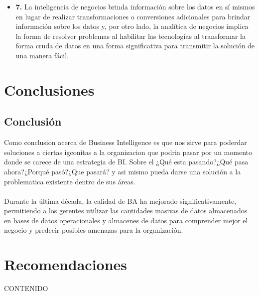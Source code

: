\documentclass[preprint,12pt]{elsarticle}
\begin{document}
\begin{itemize}
	\item{\textbf{7.}} La inteligencia de negocios brinda información sobre los datos en sí mismos en lugar de realizar 				transformaciones o conversiones adicionales para brindar información sobre los datos y, por otro lado, la analítica de negocios 			implica la forma de resolver problemas al habilitar las tecnologías al transformar la forma cruda de datos en una forma significativa 	para transmitir la solución de una manera fácil.
	\end{itemize}

\section{Conclusiones}
\subsection{Conclusión }	
Como conclusion acerca de Business Intelligence es que nos sirve para poderdar soluciones a ciertas igconitas a la organizacion que 
podria pasar por un momento donde se carece de una estrategia de BI.
Sobre el ¿Qué esta pasando?¿Qué pasa ahora?¿Porqué pasó?¿Que pasará? y asi mismo pueda darse una solución a la problematica 
existente dentro de sus áreas.\\\\
Durante la última década, la calidad de BA ha mejorado significativamente, permitiendo a los gerentes utilizar las cantidades masivas de datos almacenados en bases de datos operacionales y almacenes de datos para comprender mejor el negocio y predecir posibles amenazas para la organización.




\section{Recomendaciones}	
CONTENIDO






	
	\newpage
	
		


\end{document}
